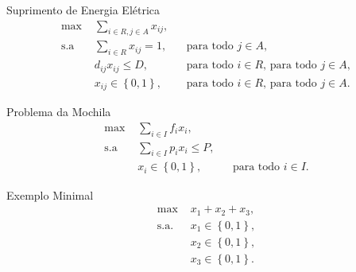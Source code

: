 \documentclass[11pt]{beamer}
\begin{document}
\begin{frame}{Suprimento de Energia Elétrica}
  \begin{align*}
    \text{max } & \sum_{i \in R, j \in A} x_{ij}, \\
    \text{s.a } & \sum_{i \in R} x_{ij} = 1, && \text{para todo $j \in A$}, \\
    & d_{ij} x_{ij} \leq D, && \text{para todo $i \in R$, para todo $j \in A$},
    \\
    & x_{ij} \in \left\{ 0, 1 \right\}, && \text{para todo $i \in R$, para todo
    $j \in A$}.
  \end{align*}
\end{frame}

\begin{frame}{Problema da Mochila}
  \begin{align*}
    \text{max } & \sum_{i \in I} f_i x_i, \\
    \text{s.a } & \sum_{i \in I} p_i x_i \leq P, \\
    & x_{i} \in \left\{ 0, 1 \right\}, && \text{para todo $i \in I$}.
  \end{align*}
\end{frame}

\begin{frame}{Exemplo Minimal}
  \begin{align}
    \text{max } & x_1 + x_2  + x_3, \nonumber \\
    \text{s.a. } & x_1 \in \left\{ 0, 1 \right\}, \tag{EM} \label{eq:EM} \\
    & x_2 \in \left\{ 0, 1 \right\}, \nonumber \\
    & x_3 \in \left\{ 0, 1 \right\}. \nonumber
  \end{align}
\end{frame}
\end{document}
